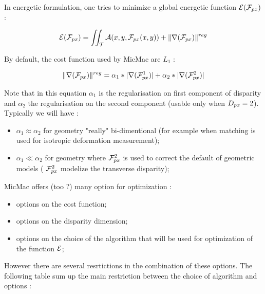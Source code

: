 In energetic formulation, one  tries to minimize a global energetic function $\Energ(\FPx)$  :

\begin{equation}
   \Energ(\FPx) = \iint_\ETer \Ress(x,y,\FPx(x,y)) + \| \nabla(\FPx) \|^{reg}
\end{equation}


By default, the cost function used by MicMac are $L_1$  :

\begin{equation}
\label{CostGrad:Lun:DDeux}
   \| \nabla(\FPx) \|^{reg} = \alpha_1*|\nabla(\FPx^1)|+\alpha_2*|\nabla(\FPx^2)|
\end{equation}


Note that in this equation $\alpha_1$ is the regularisation on first
component of disparity and $\alpha_2$ the regularisation  on the
second component (usable only when $\DimPx=2$). Typically we will have :

\begin{itemize}
   \item $\alpha_1 \approx \alpha_2$ for geometry "really" bi-dimentional
         (for example when matching is used for isotropic deformation  measurement);

   \item $\alpha_1 \ll \alpha_2$ for geometry where  $\FPx^2$ is used to correct
         the default of geometric models ( $\FPx^2$ modelize the transverse disparity);

\end{itemize}



MicMac offers (too ?) many option for optimization :

\begin{itemize}
    \item  options on the cost function;
    \item  options on the  disparity dimension;
    \item  options  on the choice of the algorithm that will be used
           for optimization of the function  $\Energ$;
\end{itemize}

However there are several resrtictions in the combination of these options.
The following table sum up the main restriction between the choice of algorithm
and options :


